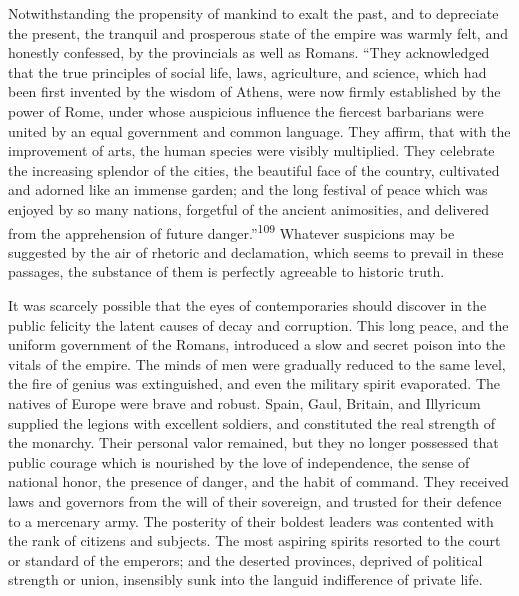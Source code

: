 Notwithstanding the propensity of mankind to exalt the past, and
to depreciate the present, the tranquil and prosperous state of
the empire was warmly felt, and honestly confessed, by the
provincials as well as Romans. “They acknowledged that the true
principles of social life, laws, agriculture, and science, which
had been first invented by the wisdom of Athens, were now firmly
established by the power of Rome, under whose auspicious
influence the fiercest barbarians were united by an equal
government and common language. They affirm, that with the
improvement of arts, the human species were visibly multiplied.
They celebrate the increasing splendor of the cities, the
beautiful face of the country, cultivated and adorned like an
immense garden; and the long festival of peace which was enjoyed
by so many nations, forgetful of the ancient animosities, and
delivered from the apprehension of future danger.”\textsuperscript{109} Whatever
suspicions may be suggested by the air of rhetoric and
declamation, which seems to prevail in these passages, the
substance of them is perfectly agreeable to historic truth.


It was scarcely possible that the eyes of contemporaries should
discover in the public felicity the latent causes of decay and
corruption. This long peace, and the uniform government of the
Romans, introduced a slow and secret poison into the vitals of
the empire. The minds of men were gradually reduced to the same
level, the fire of genius was extinguished, and even the military
spirit evaporated. The natives of Europe were brave and robust.
Spain, Gaul, Britain, and Illyricum supplied the legions with
excellent soldiers, and constituted the real strength of the
monarchy. Their personal valor remained, but they no longer
possessed that public courage which is nourished by the love of
independence, the sense of national honor, the presence of
danger, and the habit of command. They received laws and
governors from the will of their sovereign, and trusted for their
defence to a mercenary army. The posterity of their boldest
leaders was contented with the rank of citizens and subjects. The
most aspiring spirits resorted to the court or standard of the
emperors; and the deserted provinces, deprived of political
strength or union, insensibly sunk into the languid indifference
of private life.

